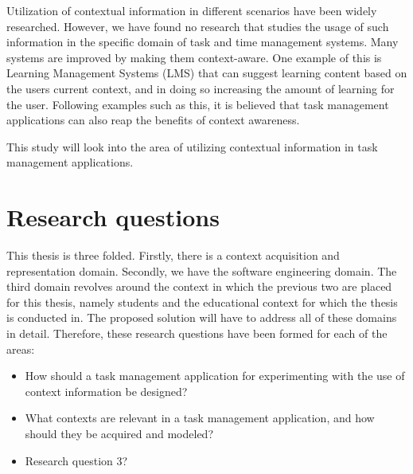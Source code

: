 Utilization of contextual information in different scenarios have been widely researched. However, we have found no research that studies the usage of such information in the specific domain of task and time management systems. Many systems are improved by making them context-aware. One example of this is Learning Management Systems (LMS) that can suggest learning content based on the users current context, and in doing so increasing the amount of learning for the user. Following examples such as this, it is believed that task management applications can also reap the benefits of context awareness.

This study will look into the area of utilizing contextual information in task management applications.





\section{Research questions}

This thesis is three folded. Firstly, there is a context acquisition and representation domain. Secondly, we have the software engineering domain. The third domain revolves around the context in which the previous two are placed for this thesis, namely students and the educational context for which the thesis is conducted in. The proposed solution will have to address all of these domains in detail. Therefore, these research questions have been formed for each of the areas:
\begin{itemize}
	\item How should a task management application for experimenting with the use of context information be designed?  
	\item What contexts are relevant in a task management application, and how should they be acquired and modeled?
	\item Research question 3?
\end{itemize}